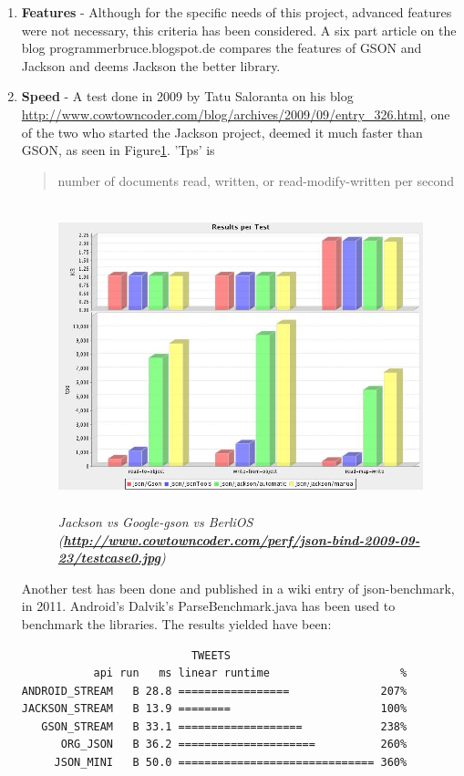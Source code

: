 \documentclass{article}
\begin{document}
\begin{enumerate}
  \item \textbf{Features} - Although for the specific needs of this project,
  advanced features were not necessary, this criteria has been considered. A
  six part article on the blog programmerbruce.blogspot.de compares the features
  of GSON and Jackson and deems Jackson the better library.
  
  \item \textbf{Speed} - A test done in 2009 by Tatu Saloranta on his blog
  \url{http://www.cowtowncoder.com/blog/archives/2009/09/entry_326.html}, one of
  the two who started the Jackson project, deemed it much faster than GSON, as
  seen in Figure\ref{fig:jacksonvsgson1}. 'Tps' is \begin{quote}number of
  documents read, written, or read-modify-written per second\end{quote}
   
  \begin{figure}
  \includegraphics[height=3.5in,width=6.23in]{./images/benchmarks/testcase0.jpg}
  \caption{\small \sl Jackson vs Google-gson vs BerliOS
  (\textbf{\url{http://www.cowtowncoder.com/perf/json-bind-2009-09-23/testcase0.jpg}})}
  \label{fig:jacksonvsgson1}
  \end{figure}
  
  Another test has been done and published in a wiki entry of json-benchmark,
  in 2011. Android's Dalvik's ParseBenchmark.java has been used to benchmark
  the libraries. The results yielded have been:\newline
  \begin{verbatim}
                          TWEETS                              
           api run   ms linear runtime                    % 
ANDROID_STREAM   B 28.8 =================              207% 
JACKSON_STREAM   B 13.9 ========                       100% 
   GSON_STREAM   B 33.1 ===================            238% 
      ORG_JSON   B 36.2 =====================          260% 
     JSON_MINI   B 50.0 ============================== 360% 


\end{verbatim}
\end{enumerate}
\end{document}
